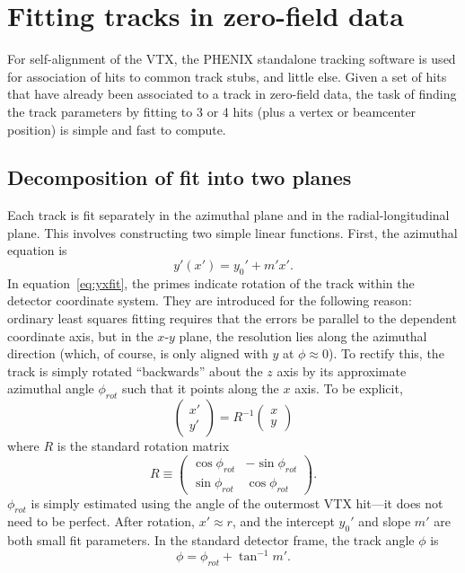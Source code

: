 \documentclass[12pt]{article}
\begin{document}
\section{Fitting tracks in zero-field data} \label{sec:trackfit}
For self-alignment of the VTX, the PHENIX standalone tracking software is used for association of hits to common track stubs, and little else. Given a set of hits that have already been associated to a track in zero-field data, the task of finding the track parameters by fitting to 3 or 4 hits (plus a vertex or beamcenter position) is simple and fast to compute.

\subsection{Decomposition of fit into two planes} \label{sec:fitdecomp}
Each track is fit separately in the azimuthal plane and in the radial-longitudinal plane. This involves constructing two simple linear functions. First, the azimuthal equation is
\begin{equation} \label{eq:yxfit}
y'(x') = y_0' + m' x'.
\end{equation}
In equation~\ref{eq:yxfit}, the primes indicate rotation of the track within the detector coordinate system. They are introduced for the following reason: ordinary least squares fitting requires that the errors be parallel to the dependent coordinate axis, but in the $x$-$y$ plane, the resolution lies along the azimuthal direction (which, of course, is only aligned with $y$ at $\phi \approx 0$). To rectify this, the track is simply rotated ``backwards'' about the $z$ axis by its approximate azimuthal angle $\phi_{rot}$ such that it points along the $x$ axis. To be explicit,
\begin{equation} \label{eq:phirot}
\begin{pmatrix}
x'\\
y'
\end{pmatrix}
= R^{-1}
\begin{pmatrix}
x\\
y
\end{pmatrix}
\end{equation}
where $R$ is the standard rotation matrix
\begin{equation} \label{eq:R}
R \equiv
\begin{pmatrix}
\cos \phi_{rot} & -\sin \phi_{rot}\\
\sin \phi_{rot} &  \cos \phi_{rot}
\end{pmatrix}.
\end{equation}
$\phi_{rot}$ is simply estimated using the angle of the outermost VTX hit---it does not need to be perfect. After rotation, $x' \approx r$, and the intercept $y_0'$ and slope $m'$ are both small fit parameters. In the standard detector frame, the track angle $\phi$ is
\begin{equation}
\phi = \phi_{rot} + \tan^{-1} m'.
\end{equation}
\end{document}
